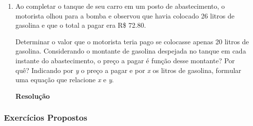 \begin{examples}\leavevmode
  \begin{enumerate}
    \item {
        Ao completar o tanque de seu carro em um posto de abastecimento, o motorista olhou para a bomba e observou que havia colocado 26 litros de gasolina e que o total a pagar era 
        R\$ 72.80. 
        \begin{tasks}
          \task Determinar o valor que o motorista teria pago se colocasse apenas 20 litros de gasolina. 
          \task Considerando o montante de gasolina despejada no tanque em cada instante do abastecimento, o preço a pagar é função desse montante? Por quê?
          \task Indicando por \textit{y} o preço a pagar e por \textit{x} os litros de gasolina, formular uma equação que relacione \textit{x} e \textit{y}.
        \end{tasks}

        \textbf{Resolução}
        
        \begin{tasks}

        \end{tasks}

      }
  \end{enumerate}
  
\end{examples}

\subsubsection{Exercícios Propostos}

